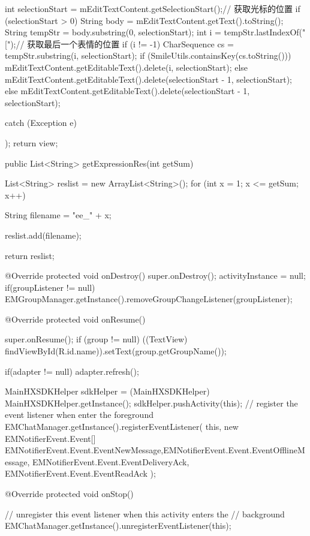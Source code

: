 {{{{{{{{								int selectionStart = mEditTextContent.getSelectionStart();// 获取光标的位置
								if (selectionStart > 0) {
									String body = mEditTextContent.getText().toString();
									String tempStr = body.substring(0, selectionStart);
									int i = tempStr.lastIndexOf("[");// 获取最后一个表情的位置
									if (i != -1) {
										CharSequence cs = tempStr.substring(i, selectionStart);
										if (SmileUtils.containsKey(cs.toString()))
											mEditTextContent.getEditableText().delete(i, selectionStart);
										else
											mEditTextContent.getEditableText().delete(selectionStart - 1,
													selectionStart);
									} else {
										mEditTextContent.getEditableText().delete(selectionStart - 1, selectionStart);
									}
								}
							}

						}
					}
				} catch (Exception e) {
				}

			}
		});
		return view;
	}

	public List<String> getExpressionRes(int getSum) {
		List<String> reslist = new ArrayList<String>();
		for (int x = 1; x <= getSum; x++) {
			String filename = "ee_" + x;

			reslist.add(filename);

		}
		return reslist;

	}

	@Override
	protected void onDestroy() {
		super.onDestroy();
		activityInstance = null;
		if(groupListener != null){
		    EMGroupManager.getInstance().removeGroupChangeListener(groupListener);
		}
	}

	@Override
	protected void onResume() {
		super.onResume();
		if (group != null)
			((TextView) findViewById(R.id.name)).setText(group.getGroupName());

		 if(adapter != null){
		     adapter.refresh();
	     }

		MainHXSDKHelper sdkHelper = (MainHXSDKHelper) MainHXSDKHelper.getInstance();
		sdkHelper.pushActivity(this);
		// register the event listener when enter the foreground
		EMChatManager.getInstance().registerEventListener(
				this,
				new EMNotifierEvent.Event[] { EMNotifierEvent.Event.EventNewMessage,EMNotifierEvent.Event.EventOfflineMessage,
						EMNotifierEvent.Event.EventDeliveryAck, EMNotifierEvent.Event.EventReadAck });
	}

	@Override
	protected void onStop() {
		// unregister this event listener when this activity enters the
		// background
		EMChatManager.getInstance().unregisterEventListener(this);

}}
